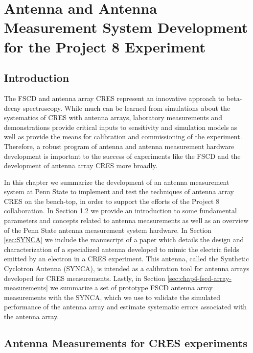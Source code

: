 

\chapter{Antenna and Antenna Measurement System Development for the Project 8 Experiment}

\section{Introduction}

The FSCD and antenna array CRES represent an innovative approach to beta-decay spectroscopy. While much can be learned from simulations about the systematics of CRES with antenna arrays, laboratory measurements and demonstrations provide critical inputs to sensitivity and simulation models as well as provide the means for calibration and commissioning of the experiment. Therefore, a robust program of antenna and antenna measurement hardware development is important to the success of experiments like the FSCD and the development of antenna array CRES more broadly.

In this chapter we summarize the development of an antenna measurement system at Penn State to implement and test the techniques of antenna array CRES on the bench-top, in order to support the efforts of the Project 8 collaboration. In Section \ref{sec:chap4-ant-meas} we provide an introduction to some fundamental parameters and concepts related to antenna measurements as well as an overview of the Penn State antenna measurement system hardware. In Section \ref{sec:SYNCA} we include the manuscript of a paper which details the design and characterization of a specialized antenna developed to mimic the electric fields emitted by an electron in a CRES experiment. This antenna, called the Synthetic Cyclotron Antenna (SYNCA), is intended as a calibration tool for antenna arrays developed for CRES measurements. Lastly, in Section \ref{sec:chap4-fscd-array-measurements} we summarize a set of prototype FSCD antenna array measurements with the SYNCA, which we use to validate the simulated performance of the antenna array and estimate systematic errors associated with the antenna array.

\section{Antenna Measurements for CRES experiments}
\label{sec:chap4-ant-meas}

